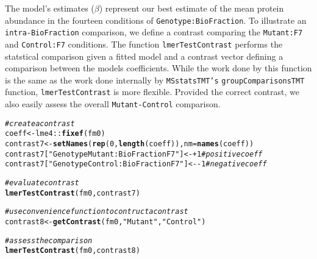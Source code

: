 \documentclass[11pt]{elife}\usepackage[]{graphicx}\usepackage[]{color}
\makeatletter
\newcommand{\hlnum}[1]{\textcolor[rgb]{0.686,0.059,0.569}{#1}}%
\newcommand{\hlstr}[1]{\textcolor[rgb]{0.192,0.494,0.8}{#1}}%
\newcommand{\hlcom}[1]{\textcolor[rgb]{0.678,0.584,0.686}{\textit{#1}}}%
\newcommand{\hlopt}[1]{\textcolor[rgb]{0,0,0}{#1}}%
\newcommand{\hlstd}[1]{\textcolor[rgb]{0.345,0.345,0.345}{#1}}%
\newcommand{\hlkwb}[1]{\textcolor[rgb]{0.69,0.353,0.396}{#1}}%
\newcommand{\hlkwc}[1]{\textcolor[rgb]{0.333,0.667,0.333}{#1}}%
\newcommand{\hlkwd}[1]{\textcolor[rgb]{0.737,0.353,0.396}{\textbf{#1}}}%
\newenvironment{kframe}{%
 \def\at@end@of@kframe{}%
 \ifinner\ifhmode%
  \def\at@end@of@kframe{\end{minipage}}%
  \begin{minipage}{\columnwidth}%
 \fi\fi%
 \def\FrameCommand##1{\hskip\@totalleftmargin \hskip-\fboxsep
 \colorbox{shadecolor}{##1}\hskip-\fboxsep
     \hskip-\linewidth \hskip-\@totalleftmargin \hskip\columnwidth}%
 \MakeFramed {\advance\hsize-\width
   \@totalleftmargin\z@ \linewidth\hsize
   \@setminipage}}%
 {\par\unskip\endMakeFramed%
 \at@end@of@kframe}
\newenvironment{knitrout}{}{} %
\makeatother
\begin{document}
The model's estimates ($\beta$) represent our best estimate of the mean protein
abundance in the fourteen conditions of \texttt{Genotype:BioFraction}. 
To illustrate an \texttt{intra-BioFraction} comparison, we 
define a contrast comparing the \texttt{Mutant:F7} and \texttt{Control:F7}
conditions. The function \texttt{lmerTestContrast} performs the statstical comparison given
a fitted model and a contrast vector defining a comparison between the models
coefficients. While the work done by this function 
is the same as the work done internally by \texttt{MSstatsTMT's}
\texttt{groupComparisonsTMT} function, \texttt{lmerTestContrast} is more
flexible. Provided the correct contrast, we also easily assess the overall
\texttt{Mutant-Control} comparison.\\


\begin{knitrout}
\color{fgcolor}\begin{kframe}
\begin{alltt}
\hlcom{# create a contrast}
\hlstd{coeff} \hlkwb{<-} \hlstd{lme4}\hlopt{::}\hlkwd{fixef}\hlstd{(fm0)}
\hlstd{contrast7} \hlkwb{<-} \hlkwd{setNames}\hlstd{(}\hlkwd{rep}\hlstd{(}\hlnum{0}\hlstd{,}\hlkwd{length}\hlstd{(coeff)),} \hlkwc{nm} \hlstd{=} \hlkwd{names}\hlstd{(coeff))}
\hlstd{contrast7[}\hlstr{"GenotypeMutant:BioFractionF7"}\hlstd{]} \hlkwb{<-} \hlopt{+}\hlnum{1} \hlcom{# positive coeff}
\hlstd{contrast7[}\hlstr{"GenotypeControl:BioFractionF7"}\hlstd{]} \hlkwb{<-} \hlopt{-}\hlnum{1} \hlcom{# negative coeff}

\hlcom{# evaluate contrast}
\hlkwd{lmerTestContrast}\hlstd{(fm0, contrast7)}
\end{alltt}
\end{kframe}
\end{knitrout}

\begin{knitrout}
\color{fgcolor}\begin{kframe}
\begin{alltt}
\hlcom{# use convenience function to contruct a contrast}
\hlstd{contrast8} \hlkwb{<-} \hlkwd{getContrast}\hlstd{(fm0,} \hlstr{"Mutant"}\hlstd{,}\hlstr{"Control"}\hlstd{)}

\hlcom{# assess the comparison}
\hlkwd{lmerTestContrast}\hlstd{(fm0, contrast8)}
\end{alltt}
\end{kframe}
\end{knitrout}
\end{document}
